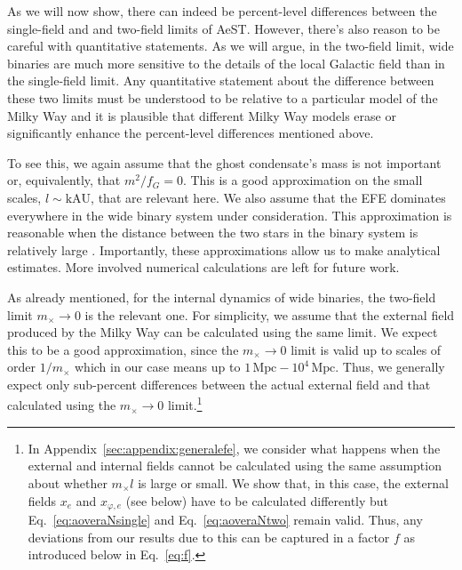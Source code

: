 \documentclass[reprint, amsmath,amssymb, nofootinbib, aps, prd]{revtex4-2}
\begin{document}
As we will now show, there can indeed be percent-level differences between the single-field and and two-field limits of AeST.
However, there's also reason to be careful with quantitative statements.
As we will argue, in the two-field limit, wide binaries are much more sensitive to the details of the local Galactic field than in the single-field limit.
Any quantitative statement about the difference between these two limits must be understood to be relative to a particular model of the Milky Way and it is plausible that different Milky Way models erase or significantly enhance the percent-level differences mentioned above.

To see this, we again assume that the ghost condensate's mass is not important or, equivalently, that $m^2/f_G = 0$.
This is a good approximation on the small scales, $l \sim \mathrm{kAU}$, that are relevant here.
We also assume that the EFE dominates everywhere in the wide binary system under consideration.
This approximation is reasonable when the distance between the two stars in the binary system is relatively large \citep{Banik2015, Banik2018}.
Importantly, these approximations allow us to make analytical estimates.
More involved numerical calculations are left for future work.

As already mentioned, for the internal dynamics of wide binaries, the two-field limit $m_\times \to 0$ is the relevant one.
For simplicity, we assume that the external field produced by the Milky Way can be calculated using the same limit.
We expect this to be a good approximation, since the $m_\times \to 0$ limit is valid up to scales of order $1/m_\times$ which in our case means up to $1\,\mathrm{Mpc} - 10^4\,\mathrm{Mpc}$.
Thus, we generally expect only sub-percent differences between the actual external field and that calculated using the $m_\times \to 0$ limit.\footnote{
  In Appendix~\ref{sec:appendix:generalefe}, we consider what happens when the external and internal fields cannot be calculated using the same assumption about whether $m_\times l$ is large or small.
  We show that, in this case, the external fields $x_e$ and $x_{\varphi,e}$ (see below) have to be calculated differently but Eq.~\eqref{eq:aoveraNsingle} and Eq.~\eqref{eq:aoveraNtwo} remain valid.
  Thus, any deviations from our results due to this can be captured in a factor $f$ as introduced below in Eq.~\eqref{eq:f}.
}
\end{document}
